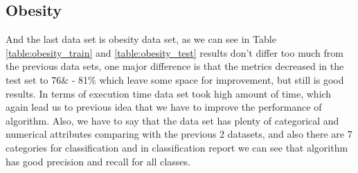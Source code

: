 \documentclass{article}
\begin{document}
\subsection{Obesity}
And the last data set is obesity data set, as we can see in Table \ref{table:obesity_train} and \ref{table:obesity_test} results 
don't differ too much from the previous data sets, one major difference is that the metrics decreased in the test set to 76\& - 81\%
which leave some space for improvement, but still is good results. In terms of execution time data set took high amount of time, which
again lead us to previous idea that we have to improve the performance of algorithm. Also, we have to say that the data set has plenty of categorical and numerical
attributes comparing with the previous 2 datasets, and also there are 7 categories for classification and in classification report 
 we can see that algorithm has good precision and recall for all classes.
\end{document}
